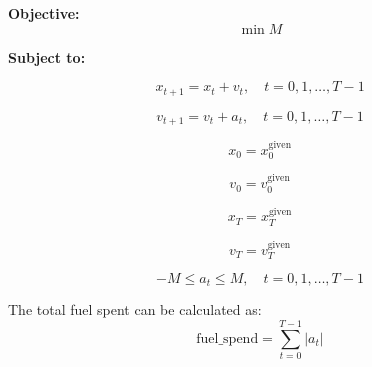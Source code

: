 \documentclass{article}
\begin{document}
\textbf{Objective:}
\[
\min M
\]

\textbf{Subject to:}

\[
x_{t+1} = x_t + v_t, \quad t = 0, 1, \ldots, T-1
\]

\[
v_{t+1} = v_t + a_t, \quad t = 0, 1, \ldots, T-1
\]

\[
x_0 = x_0^{\text{given}}
\]

\[
v_0 = v_0^{\text{given}}
\]

\[
x_T = x_T^{\text{given}}
\]

\[
v_T = v_T^{\text{given}}
\]

\[
-M \leq a_t \leq M, \quad t = 0, 1, \ldots, T-1
\]

The total fuel spent can be calculated as:
\[
\text{fuel\_spend} = \sum_{t = 0}^{T-1} |a_t|
\]
\end{document}
